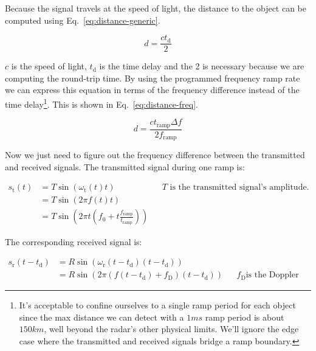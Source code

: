 \documentclass{default}
\begin{document}
Because the signal travels at the speed of light, the distance to the object can be computed using
Eq.~\ref{eq:distance-generic}.

\begin{equation}
        \label{eq:distance-generic}
        d = \frac{c t_{\text{d}}}{2}
\end{equation}

$c$ is the speed of light, $t_{\text{d}}$ is the time delay and the 2 is necessary because we are
computing the round-trip time. By using the programmed frequency ramp rate we can express this
equation in terms of the frequency difference instead of the time delay\footnote{It's acceptable to
  confine ourselves to a single ramp period for each object since the max distance we can detect
  with a $1 \si{ms}$ ramp period is about $150 \si{km}$, well beyond the radar's other physical
  limits. We'll ignore the edge case where the transmitted and received signals bridge a ramp
  boundary.}. This is shown in Eq.~\ref{eq:distance-freq}.

\begin{equation}
        \label{eq:distance-freq}
        d = \frac{c t_{\text{ramp}} \Delta f}{2 f_{\text{ramp}}}
\end{equation}

Now we just need to figure out the frequency difference between the transmitted and received
signals. The transmitted signal during one ramp is:

\begin{align}
  s_{\text{t}}(t) &= T \sin\left(\omega_{\text{t}}(t) t\right)  && \text{$T$ is the transmitted
                                                                   signal's amplitude.} \\
                  &= T \sin\left(2 \pi f(t) t\right) \\
                  &= T \sin\left(2 \pi t \left( f_0 + t \frac{f_{\text{ramp}}}{t_{\text{ramp}}}
                    \right) \right)
\end{align}

The corresponding received signal is:

\begin{align}
  s_{\text{r}}(t-t_{\text{d}}) &= R \sin \left(\omega_{\text{r}}(t-t_{\text{d}})
                                 (t-t_{\text{d}})\right) \\
                               &= R \sin \left(2 \pi \left(f(t-t_{\text{d}}) +
                                 f_{\text{D}}\right)(t-t_{\text{d}})\right) && \text{$f_{\text{D}}$
                                                                               is the Doppler
                                                                               shift.}
\end{align}
\end{document}
